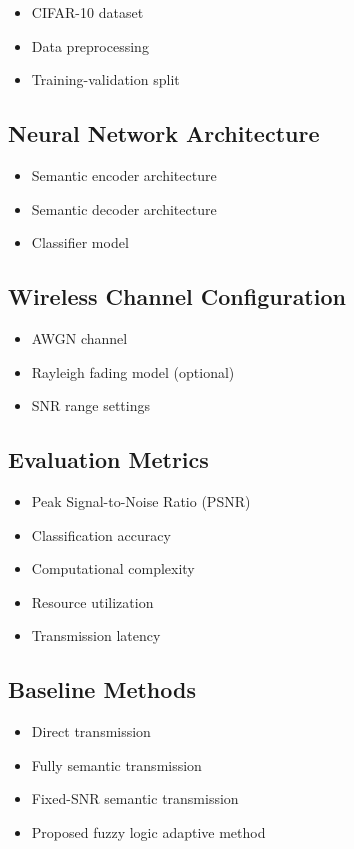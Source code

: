 \documentclass[lettersize,journal]{IEEEtran}
\begin{document}
\begin{itemize}
    \item CIFAR-10 dataset
    \item Data preprocessing
    \item Training-validation split
\end{itemize}

\subsection{Neural Network Architecture}

\begin{itemize}
    \item Semantic encoder architecture
    \item Semantic decoder architecture
    \item Classifier model
\end{itemize}

\subsection{Wireless Channel Configuration}

\begin{itemize}
    \item AWGN channel
    \item Rayleigh fading model (optional)
    \item SNR range settings
\end{itemize}

\subsection{Evaluation Metrics}

\begin{itemize}
    \item Peak Signal-to-Noise Ratio (PSNR)
    \item Classification accuracy
    \item Computational complexity
    \item Resource utilization
    \item Transmission latency
\end{itemize}

\subsection{Baseline Methods}

\begin{itemize}
    \item Direct transmission
    \item Fully semantic transmission
    \item Fixed-SNR semantic transmission
    \item Proposed fuzzy logic adaptive method
\end{itemize}
\end{document}
